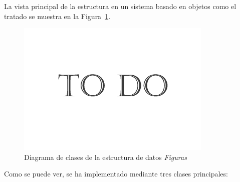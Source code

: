 	La vista principal de la estructura en un sistema basado en objetos como el tratado se muestra en la Figura~\ref{fig:diagramaClasesFigure}.\\

		\begin{figure}[htbp]
		\centering
		\includegraphics[scale=0.47]{graphics/todo.png}
		\caption{Diagrama de clases de la estructura de datos \emph{Figuras}}
		\label{fig:diagramaClasesFigure}
		\end{figure}
		
		
	Como se puede ver, se ha implementado mediante tres clases principales:
	
